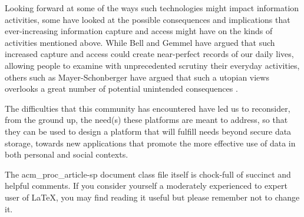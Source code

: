 \documentclass{acm_proc_article-sp}
\begin{document}

Looking forward at some of the ways such technologies might impact information activities, some have looked at the possible consequences and implications that ever-increasing information capture and access might have on the kinds of activities mentioned above.  While Bell and Gemmel have argued \cite{bell2010total} that such increased capture and access could create near-perfect records of our daily lives, allowing people to examine with unprecedented scrutiny their everyday activities, others such as Mayer-Schonberger have argued that such a utopian views overlooks a great number of potential unintended consequences \cite{mayer-schonberger2013}.   


The difficulties that this community has encountered have led us to reconsider, from the ground up, the need(s) these platforms are meant to address, so that they can be used to design a platform that will fulfill needs beyond secure data storage, towards new applications that promote the more effective use of data in both personal and social contexts.


The acm\_proc\_article-sp document class file itself is chock-full of succinct
and helpful comments.  If you consider yourself a moderately
experienced to expert user of \LaTeX, you may find reading
it useful but please remember not to change it.
\balancecolumns

\end{document}
